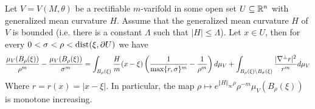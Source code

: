 \begin{theorem}\label{thm: monotonicity formula}
Let $V=V(M, \theta)$ be a rectifiable $m$-varifold in some open set $U \subseteq \mathbb{R}^n$ with generalized mean curvature $H$. Assume that the generalized mean curvature $H$ of $V$ is bounded (i.e. there is a constant $\Lambda$ such that $|H| \le \Lambda$). Let $x \in U$, then for every $0 < \sigma < \rho < \operatorname{dist}(\xi, \partial U)$ we have
\[
    \frac{\mu_V(B_{\rho}(\xi))}{\rho^m} - \frac{\mu_V(B_{\rho}(\xi))}{\sigma^m} = \int_{B_{\rho}(\xi)} \frac{H}{m}(x - \xi) \left( \frac{1}{\max\{r,\sigma\}^m} - \frac{1}{\rho^m} \right) d\mu_V + \int_{ B_{\rho}(\xi) \setminus B_{\sigma}(\xi) } \frac{|\nabla^{\perp} r|^2}{r^m} d\mu_V
\]
Where $r=r(x)=|x - \xi|$.
In particular, the map $\rho \mapsto e^{\Vert H \Vert_{\infty}\rho}\rho^{-m}\mu_V(B_{\rho}(\xi))$ is monotone increasing.
\end{theorem}
